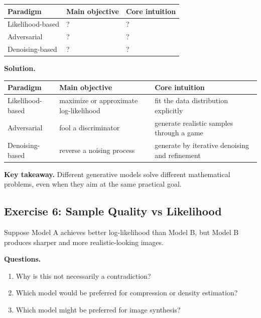 \begin{center}
\begin{tabular}{|l|l|l|}
\hline
Paradigm & Main objective & Core intuition \\
\hline
Likelihood-based & ? & ? \\
Adversarial & ? & ? \\
Denoising-based & ? & ? \\
\hline
\end{tabular}
\end{center}

\medskip

\noindent
\textbf{Solution.}

\begin{center}
\begin{tabular}{|l|l|l|}
\hline
Paradigm & Main objective & Core intuition \\
\hline
Likelihood-based & maximize or approximate log-likelihood & fit the data distribution explicitly \\
Adversarial & fool a discriminator & generate realistic samples through a game \\
Denoising-based & reverse a noising process & generate by iterative denoising and refinement \\
\hline
\end{tabular}
\end{center}

\medskip

\noindent
\textbf{Key takeaway.}  
Different generative models solve different mathematical problems, even when they aim at the same practical goal.

\subsection{Exercise 6: Sample Quality vs Likelihood}

Suppose Model A achieves better log-likelihood than Model B, but Model B produces sharper and more realistic-looking images.

\medskip

\noindent
\textbf{Questions.}
\begin{enumerate}
    \item Why is this not necessarily a contradiction?
    \item Which model would be preferred for compression or density estimation?
    \item Which model might be preferred for image synthesis?
\end{enumerate}

